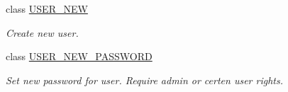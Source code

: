 \begin{DoxyCompactItemize}
class \mbox{\hyperlink{class_authority_controller_1_1_queries_1_1_u_s_e_r___n_e_w}{U\+S\+E\+R\+\_\+\+N\+EW}}
\begin{DoxyCompactList}\small\item\em Create new user. \end{DoxyCompactList}\item 
class \mbox{\hyperlink{class_authority_controller_1_1_queries_1_1_u_s_e_r___n_e_w___p_a_s_s_w_o_r_d}{U\+S\+E\+R\+\_\+\+N\+E\+W\+\_\+\+P\+A\+S\+S\+W\+O\+RD}}
\begin{DoxyCompactList}\small\item\em Set new password for user. Require admin or certen user rights. \end{DoxyCompactList}\end{DoxyCompactItemize}
